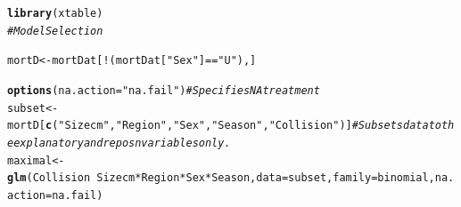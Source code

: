 \documentclass{article}\usepackage[]{graphicx}\usepackage[]{color}
\makeatletter
\newcommand{\hlstr}[1]{\textcolor[rgb]{0.192,0.494,0.8}{#1}}%
\newcommand{\hlcom}[1]{\textcolor[rgb]{0.678,0.584,0.686}{\textit{#1}}}%
\newcommand{\hlopt}[1]{\textcolor[rgb]{0,0,0}{#1}}%
\newcommand{\hlstd}[1]{\textcolor[rgb]{0.345,0.345,0.345}{#1}}%
\newcommand{\hlkwb}[1]{\textcolor[rgb]{0.69,0.353,0.396}{#1}}%
\newcommand{\hlkwc}[1]{\textcolor[rgb]{0.333,0.667,0.333}{#1}}%
\newcommand{\hlkwd}[1]{\textcolor[rgb]{0.737,0.353,0.396}{\textbf{#1}}}%
\newenvironment{kframe}{%
 \def\at@end@of@kframe{}%
 \ifinner\ifhmode%
  \def\at@end@of@kframe{\end{minipage}}%
  \begin{minipage}{\columnwidth}%
 \fi\fi%
 \def\FrameCommand##1{\hskip\@totalleftmargin \hskip-\fboxsep
 \colorbox{shadecolor}{##1}\hskip-\fboxsep
     \hskip-\linewidth \hskip-\@totalleftmargin \hskip\columnwidth}%
 \MakeFramed {\advance\hsize-\width
   \@totalleftmargin\z@ \linewidth\hsize
   \@setminipage}}%
 {\par\unskip\endMakeFramed%
 \at@end@of@kframe}
\newenvironment{knitrout}{}{} %
\makeatother
\begin{document}
\begin{knitrout}
\color{fgcolor}\begin{kframe}
\begin{alltt}
\hlkwd{library}\hlstd{(xtable)}
\hlcom{#Model Selection}

\hlstd{mortD} \hlkwb{<-} \hlstd{mortDat[}\hlopt{!}\hlstd{(mortDat[}\hlstr{"Sex"}\hlstd{]} \hlopt{==} \hlstr{"U"}\hlstd{),]}

\hlkwd{options}\hlstd{(}\hlkwc{na.action} \hlstd{=} \hlstr{"na.fail"}\hlstd{)} \hlcom{#Specifies NA treatment}
\hlstd{subset} \hlkwb{<-} \hlstd{mortD[}\hlkwd{c}\hlstd{(}\hlstr{"Sizecm"}\hlstd{,}\hlstr{"Region"}\hlstd{,} \hlstr{"Sex"}\hlstd{,} \hlstr{"Season"}\hlstd{,}\hlstr{"Collision"}\hlstd{)]} \hlcom{#Subsets data to the explanatory and reposn variables only. }
\hlstd{maximal} \hlkwb{<-} \hlkwd{glm}\hlstd{(Collision} \hlopt{~} \hlstd{Sizecm}\hlopt{*}\hlstd{Region}\hlopt{*}\hlstd{Sex}\hlopt{*}\hlstd{Season,} \hlkwc{data} \hlstd{= subset,} \hlkwc{family} \hlstd{= binomial,} \hlkwc{na.action} \hlstd{= na.fail)}
\end{alltt}
\end{kframe}
\end{knitrout}
\end{document}
